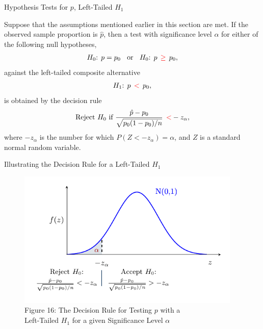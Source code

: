 \documentclass[pdf]{beamer}
\theoremstyle{remark}
\theoremstyle{definition}
\begin{document}
\begin{frame}[t, label=pLT]{Hypothesis Tests for $p$, Left-Tailed $H_1$}
\small
\begin{tcolorbox}[colback=white!5,colframe=franklinblue]%
Suppose that the assumptions mentioned earlier in this section are met. If the observed sample proportion is $\hat{p}$, then a test with significance level $\alpha$ for either of the following null hypotheses, 
\vspace{-1.0ex}
\begin{align*} 
H_0\text{: }  p = p_0 \;\; \text{ or } \;\; H_0\text{: }  p \;\, \textcolor{red}{\geq} \;\, p_0, 
\end{align*} 
\vspace{-1.0ex}
against the left-tailed composite alternative 
\vspace{0.0ex}
\begin{align*} 
H_1\text{: }  p \;\, \textcolor{red}{<} \;\, p_0, 
\end{align*} 
\vspace{-1.0ex}
is obtained by the decision rule 
\vspace{0.0ex}
\begin{equation} 
\text{Reject } H_0 \text{ if } \frac{\hat{p} - p_0}{\sqrt{p_0(1-p_0)/ n}} \;\, \textcolor{red}{<}  -z_{\alpha},
\end{equation} 
where $-z_{\alpha}$ is the number for which $P(Z < -z_{\alpha}) = \alpha$, and $Z$ is a standard normal random variable. 
\end{tcolorbox}
\end{frame}

\begin{frame}[t]{Illustrating the Decision Rule for a Left-Tailed $H_1$ }
\begin{figure}[htbp]
    \centering
    \captionsetup{justification=centering}
    \includegraphics[clip, trim=0.5cm 0.5cm 0.0cm 0cm, width=0.95\textwidth]{Hypothesis_Testing_Module_9_pZ2.pdf}  
    \caption{Figure {\color{franklinblue} 16}: The Decision Rule for Testing $p$ with a \\ Left-Tailed $H_1$ for a given Significance Level $\alpha$}
    \label{fig:gauss8}
\end{figure}
\end{frame}
\end{document}

